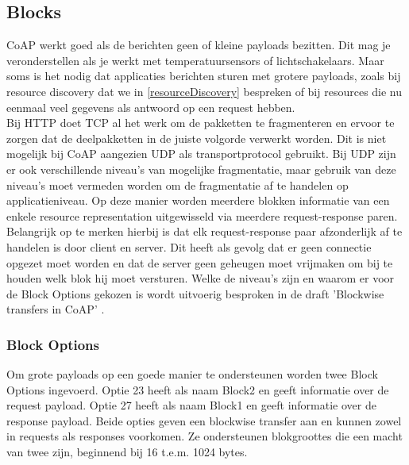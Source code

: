 \subsection{Blocks}
CoAP werkt goed als de berichten geen of kleine payloads bezitten. Dit mag je veronderstellen als je werkt met temperatuursensors of lichtschakelaars. Maar soms is het nodig dat applicaties berichten sturen met grotere payloads, zoals bij resource discovery dat we in \ref{resourceDiscovery} bespreken of bij resources die nu eenmaal veel gegevens als antwoord op een request hebben.\\

Bij HTTP doet TCP al het werk om de pakketten te fragmenteren en ervoor te zorgen dat de deelpakketten in de juiste volgorde verwerkt worden. Dit is niet mogelijk bij CoAP aangezien UDP als transportprotocol gebruikt. Bij UDP zijn er ook verschillende niveau's van mogelijke fragmentatie, maar gebruik van deze niveau's moet vermeden worden om de fragmentatie af te handelen op applicatieniveau. Op deze manier worden meerdere blokken informatie van een enkele resource representation uitgewisseld via meerdere request-response paren. Belangrijk op te merken hierbij is dat elk request-response paar afzonderlijk af te handelen is door client en server. Dit heeft als gevolg dat er geen connectie opgezet moet worden en dat de server geen geheugen moet vrijmaken om bij te houden welk blok hij moet versturen. Welke de niveau's zijn en waarom er voor de Block Options gekozen is wordt uitvoerig besproken in de draft 'Blockwise transfers in CoAP' \cite{blockwiseTransfer}.

\subsubsection{Block Options}
Om grote payloads op een goede manier te ondersteunen worden twee Block Options ingevoerd. Optie 23 heeft als naam Block2 en geeft informatie over de request payload. Optie 27 heeft als naam Block1 en geeft informatie over de response payload. Beide opties  geven een blockwise transfer aan en kunnen zowel in requests als responses voorkomen. Ze ondersteunen blokgroottes die een macht van twee zijn, beginnend bij 16 t.e.m. 1024 bytes.

